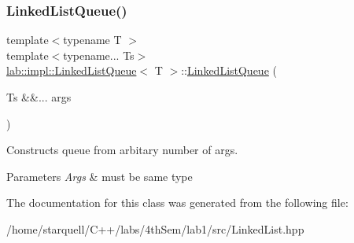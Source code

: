 \subsubsection{\texorpdfstring{Linked\+List\+Queue()}{LinkedListQueue()}}
{\footnotesize\ttfamily template$<$typename T $>$ \\
template$<$typename... Ts$>$ \\
\hyperlink{classlab_1_1impl_1_1LinkedListQueue}{lab\+::impl\+::\+Linked\+List\+Queue}$<$ T $>$\+::\hyperlink{classlab_1_1impl_1_1LinkedListQueue}{Linked\+List\+Queue} (\begin{DoxyParamCaption}\item[{Ts \&\&...}]{args }\end{DoxyParamCaption})}



Constructs queue from arbitary number of args. 


\begin{DoxyParams}{Parameters}
{\em Args} & must be same type \\
\hline
\end{DoxyParams}


The documentation for this class was generated from the following file\+:\begin{DoxyCompactItemize}
\item 
/home/starquell/\+C++/labs/4th\+Sem/lab1/src/Linked\+List.\+hpp\end{DoxyCompactItemize}
